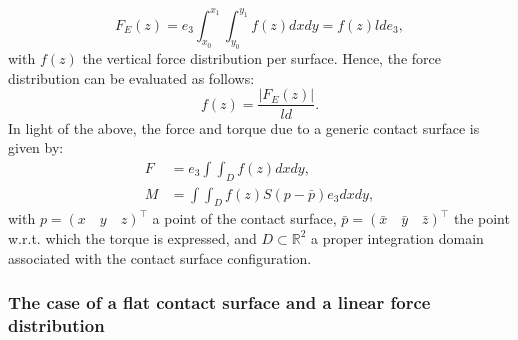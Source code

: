 \documentclass{article}
\begin{document}
\begin{equation}
\label{eq:forcesDist3DEst}
F_E(z) = e_3 \int_{x_0}^{x_1} \int_{y_0}^{y_1} f(z) dx dy = f(z) l d e_3,
\end{equation}
with 
$f(z)$  the vertical force distribution per surface. Hence, the force distribution can be evaluated as follows:
\begin{equation}
\label{fromForceToDistr3D}
f(z) = \frac{|F_E(z)|}{ld}.
\end{equation}
In light of the above, the force and torque due to a generic contact surface is given by:
\begin{subequations}
\label{forceTorque3DGeneral}
    \begin{alignat}{2}
\label{eq:forcesDist3DE}
F &= e_3 \int\int_{{D}} f(z) dx dy, \\
\label{eq:torqueDist3DE}
M &= 
\int \int_{{D}}
f(z)S(p-\bar{p})e_3 dx dy, 
    \end{alignat}
\end{subequations}
with $p=(x \quad y \quad z)^\top$ a point of the contact surface,  
$\bar{p} = (\bar{x} \quad \bar{y} \quad \bar{z})^\top$ the point w.r.t. which the torque is expressed, and $D \subset \mathbb{R}^2$ a proper integration domain associated with the contact surface configuration.
\begin{figure}[t]
\end{figure}
%
%        

\subsubsection{The case of a flat contact surface and a linear force distribution}
\end{document}
